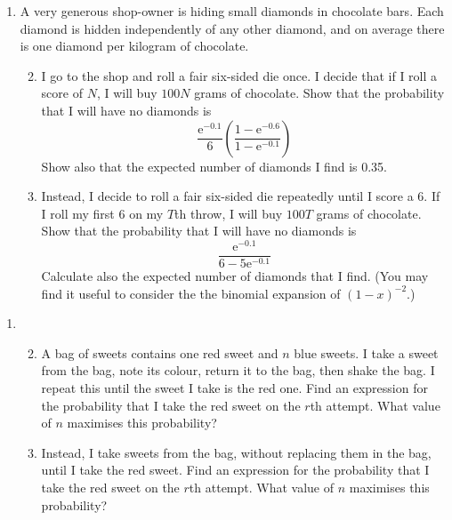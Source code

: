 \documentclass[a4, 11pt]{report}
\newlength{\qspace}
\newcounter{qnumber}
\newenvironment{question}%
 {\vspace{\qspace}
  \begin{enumerate}[\bfseries 1\quad][10]%
    \setcounter{enumi}{\value{qnumber}}%
    \item%
 }
{
  \end{enumerate}
  \filbreak
  \stepcounter{qnumber}
 }
\newenvironment{questionparts}[1][1]%
 {
  \begin{enumerate}[\bfseries (i)]%
    \setcounter{enumii}{#1}
    \addtocounter{enumii}{-1}
    \setlength{\itemsep}{5mm}
    \setlength{\parskip}{8pt}
 }
 {
  \end{enumerate}
 }
\def\e{{\mathrm e}}
\def\l{\left(}
\def\r{\right)}
\begin{document}
\begin{question}
A very generous shop-owner is hiding small diamonds in 
chocolate bars. Each diamond is hidden independently of any other diamond, 
and on average there is one diamond per kilogram of chocolate.

\begin{questionparts}
\item I go to the shop and roll a fair six-sided die once. 
I decide  that if I roll a score of $N$, I will buy $100N$ grams 
of chocolate. 
Show that the probability that I will have no diamonds is
\[
\frac{\e^{-0.1}}{ 6} \l \frac{1 - \e^{-0.6}  }{  1 - \e^{-0.1}} \r
\]
Show also that the expected number of diamonds I find is 0.35.

\item Instead, I decide to roll a fair six-sided 
die repeatedly until I score a 6. If I roll my first 6 on my $T$th throw, 
I will buy $100T$ grams of chocolate. 
Show that the probability that I will have no diamonds is 
\[
\frac{\e^{-0.1}}{ 6 - 5\e^{-0.1}}
\]
Calculate also the expected number of diamonds that I find.
(You may find it useful to consider the
the binomial 
expansion of $\l 1 - x \r^{-2}$.)

\end{questionparts}
\end{question}

\begin{question}
\begin{questionparts}
\item A bag of sweets contains one red sweet and $n$ blue sweets. 
I take a sweet from the bag, note  its colour, 
return it  to the bag, then shake the bag. 
I repeat this until the  sweet I take is the red one.
Find an expression for the probability that I take
 the red sweet on the $r$th attempt. 
What value of $n$ maximises this probability? 

\item Instead, I take sweets from the bag, without 
replacing them in the bag, until I take the red sweet.
Find an expression for the probability that I take
 the red sweet on the $r$th attempt. 
What value of $n$ maximises this probability? 

\end{questionparts}
\end{question}
	
\end{document}
